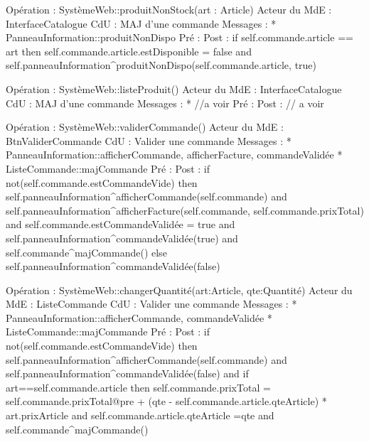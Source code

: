 Opération : SystèmeWeb::produitNonStock(art : Article)
Acteur du MdE : InterfaceCatalogue
CdU : MAJ d’une commande
Messages :
* PanneauInformation::{produitNonDispo} 
Pré :
Post :  
        if self.commande.article == art then
                self.commande.article.estDisponible = false 
and
                self.panneauInformation^produitNonDispo(self.commande.article, true)



Opération : SystèmeWeb::listeProduit()
Acteur du MdE : InterfaceCatalogue
CdU : MAJ d’une commande
Messages :
* //a voir
Pré :
Post :  // a voir



Opération : SystèmeWeb::validerCommande()
Acteur du MdE : BtnValiderCommande
CdU : Valider une commande
Messages : 
* PanneauInformation::{afficherCommande, afficherFacture, commandeValidée}
* ListeCommande::{majCommande}
Pré :
Post :  
if not(self.commande.estCommandeVide) then
        self.panneauInformation^afficherCommande(self.commande) 
and
self.panneauInformation^afficherFacture(self.commande, 
self.commande.prixTotal) 
and
                self.commande.estCommandeValidée = true 
and 
                self.panneauInformation^commandeValidée(true) 
and
                self.commande^majCommande()
        else 
                self.panneauInformation^commandeValidée(false)




Opération : SystèmeWeb::changerQuantité(art:Article, qte:Quantité)
Acteur du MdE : ListeCommande  
CdU : Valider une commande
Messages : 
* PanneauInformation::{afficherCommande, commandeValidée}
* ListeCommande::{majCommande}
Pré :
Post :  
if not(self.commande.estCommandeVide) then
                self.panneauInformation^afficherCommande(self.commande) 
and
                self.panneauInformation^commandeValidée(false) 
and
                if art==self.commande.article then
                        self.commande.prixTotal = self.commande.prixTotal@pre + (qte - 
self.commande.article.qteArticle) * art.prixArticle
and
                        self.commande.article.qteArticle =qte
                and 
                self.commande^majCommande()
                


